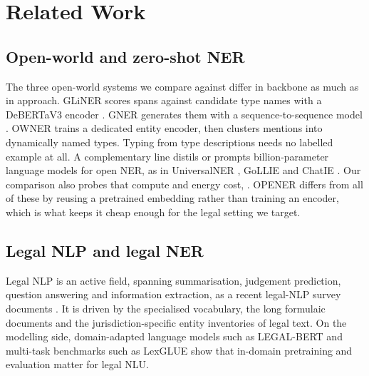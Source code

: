 \section{Related Work}
\label{sec:related}

\subsection{Open-world and zero-shot NER}
The three open-world systems we compare against differ in backbone as much as in approach. GLiNER \citep{zaratiana2024gliner} scores spans against candidate type names with a DeBERTaV3 encoder \citep{he2023debertav3}. GNER \citep{ding2024gner} generates them with a sequence-to-sequence model \citep{raffel2020t5}. OWNER \citep{genest2025owner} trains a dedicated entity encoder, then clusters mentions into dynamically named types. Typing from type descriptions \citep{aly2021zeroshot} needs no labelled example at all. A complementary line distils or prompts billion-parameter language models for open NER, as in UniversalNER \citep{zhou2024universalner}, GoLLIE \citep{sainz2024gollie} and ChatIE \citep{wei2024chatie}. Our comparison also probes that compute and energy cost, . OPENER differs from all of these by reusing a pretrained embedding rather than training an encoder, which is what keeps it cheap enough for the legal setting we target.

\subsection{Legal NLP and legal NER}
Legal NLP is an active field, spanning summarisation, judgement prediction, question answering and information extraction, as a recent legal-NLP survey documents \citep{ariai2025legalnlp}. It is driven by the specialised vocabulary, the long formulaic documents and the jurisdiction-specific entity inventories of legal text. On the modelling side, domain-adapted language models such as LEGAL-BERT \citep{chalkidis2020legalbert} and multi-task benchmarks such as LexGLUE \citep{chalkidis2022lexglue} show that in-domain pretraining and evaluation matter for legal NLU.

